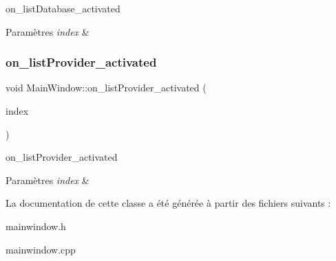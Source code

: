 on\+\_\+list\+Database\+\_\+activated 


\begin{DoxyParams}{Paramètres}
{\em index} & \\
\hline
\end{DoxyParams}
\mbox{\label{class_main_window_a5c37de425b15bf9117aae7b6b67df243}} 
\subsubsection{\texorpdfstring{on\+\_\+list\+Provider\+\_\+activated}{on\_listProvider\_activated}}
{\footnotesize\ttfamily void Main\+Window\+::on\+\_\+list\+Provider\+\_\+activated (\begin{DoxyParamCaption}\item[{const Q\+Model\+Index \&}]{index }\end{DoxyParamCaption})\hspace{0.3cm}{\ttfamily [slot]}}



on\+\_\+list\+Provider\+\_\+activated 


\begin{DoxyParams}{Paramètres}
{\em index} & \\
\hline
\end{DoxyParams}


La documentation de cette classe a été générée à partir des fichiers suivants \+:\begin{DoxyCompactItemize}
\item 
mainwindow.\+h\item 
mainwindow.\+cpp\end{DoxyCompactItemize}
